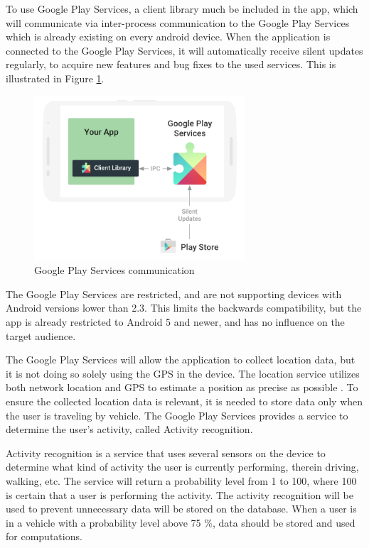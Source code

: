 To use Google Play Services, a client library much be included in the app, which will communicate via inter-process communication to the Google Play Services which is already existing on every android device. 
When the application is connected to the Google Play Services, it will automatically receive silent updates regularly, to acquire new features and bug fixes to the used services. 
This is illustrated in Figure \ref{fig:gapifigure}\cite{GapiOverview}.

\begin{figure}[h]
	\centering
	\includegraphics[width=0.7\textwidth]{figures/play-services-diagram.png}
	\caption{Google Play Services communication\cite{GapiFigure}}
	\label{fig:gapifigure}
\end{figure}

The Google Play Services are restricted, and are not supporting devices with Android versions lower than 2.3. 
This limits the backwards compatibility, but the app is already restricted to Android 5 and newer, and has no influence on the target audience.

The Google Play Services will allow the application to collect location data, but it is not doing so solely using the GPS in the device. 
The location service utilizes both network location and GPS to estimate a position as precise as possible \cite{GapiLocation}. 
To ensure the collected location data is relevant, it is needed to store data only when the user is traveling by vehicle.
The Google Play Services provides a service to determine the user's activity, called Activity recognition. 

Activity recognition is a service that uses several sensors on the device to determine what kind of activity the user is currently performing, therein driving, walking, etc.
The service will return a probability level from 1 to 100, where 100 is certain that a user is performing the activity.
The activity recognition will be used to prevent unnecessary data will be stored on the database. 
When a user is in a vehicle with a probability level above 75 \%, data should be stored and used for computations.

